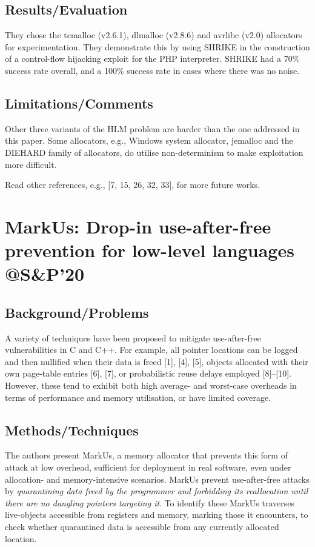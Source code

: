 \subsection{Results/Evaluation}
 They chose the tcmalloc (v2.6.1), dlmalloc (v2.8.6) and avrlibc (v2.0) allocators for experimentation.  They demonstrate this by using SHRIKE in the construction of a control-flow hijacking exploit for the PHP interpreter.  SHRIKE had a 70\% success rate overall, and a 100\% success rate in cases where there was no noise.
\subsection{Limitations/Comments}
Other three variants of the HLM problem are harder than the one addressed in this paper. Some allocators, e.g., Windows system allocator, jemalloc and the DIEHARD family of allocators, do utilise non-determinism to make exploitation more difficult.

Read other references, e.g., [7, 15, 26, 32, 33], for more future works.
\newpage
\section{MarkUs: Drop-in use-after-free prevention for
low-level languages \\@S\&P'20}

\subsection{Background/Problems}
A variety of techniques have been proposed to mitigate use-after-free vulnerabilities in C and C++. For example, all pointer locations can be logged and then nullified when their data is freed [1], [4], [5], objects allocated with their own page-table entries [6], [7], or probabilistic reuse delays employed [8]–[10]. However, these tend to exhibit both high average- and worst-case overheads in terms of performance and memory utilisation, or have limited coverage.
\subsection{Methods/Techniques}
The authors present MarkUs, a memory allocator that prevents this form of attack at low overhead, sufficient for deployment in real software, even under allocation- and memory-intensive scenarios. MarkUs prevent use-after-free attacks by \emph{quarantining data freed by the programmer and forbidding its reallocation until there are no dangling pointers targeting it}. To identify these MarkUs traverses live-objects accessible from registers and memory, marking those it encounters, to check whether quarantined data is accessible from any currently allocated location. 

